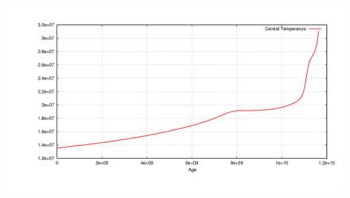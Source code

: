 \documentclass[12pt]{article}
\begin{document}
\begin{figure}[!ht]
\begin{center}
\includegraphics[width=1.0\textwidth]{ex_1_3_e.png}
\end{center}
\vspace*{-10mm}
\caption{}
\label{fig:ex_1.3_e}
\end{figure}
\end{document}
